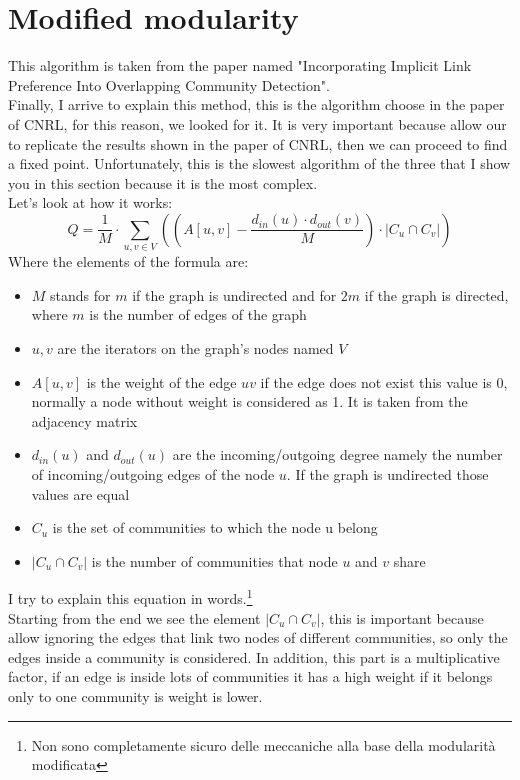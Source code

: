 \section{Modified modularity}
This algorithm is taken from the paper named "Incorporating Implicit Link Preference Into Overlapping Community Detection".\\
Finally, I arrive to explain this method, this is the algorithm choose in the paper of CNRL, for this reason, we looked for it. It is very important because allow our to replicate the results shown in the paper of CNRL, then we can proceed to find a fixed point. Unfortunately, this is the slowest algorithm of the three that I show you in this section because it is the most complex.\\
Let's look at how it works:
\begin{equation}
	Q = \frac{1}{M} \cdot \sum_{u,v \in V}
		\left(
			\left( A \left[ u,v \right] - \frac{ d_{in}\left(u\right) \cdot d_{out}\left(v\right) }{M} \right)
			\cdot
			|C_u \cap C_v| 
		\right)
	\label{eq:m_mod}
\end{equation}
Where the elements of the formula are:
\begin{itemize}
	\item $M$ stands for $m$ if the graph is undirected and for $2m$ if the graph is directed, where $m$ is the number of edges of the graph
	\item $u,v$ are the iterators on the graph's nodes named $V$
	\item $A \left[ u,v \right]$ is the weight of the edge $uv$ if the edge does not exist this value is 0, normally a node without weight is considered as 1. It is taken from the adjacency matrix
	\item $d_{in}\left(u\right)$ and $d_{out}\left(u\right)$ are the incoming/outgoing degree namely the number of incoming/outgoing edges of the node $u$. If the graph is undirected those values are equal
	\item $C_u$ is the set of communities to which the node u belong
	\item $|C_u \cap C_v|$ is the number of communities that node $u$ and $v$ share
\end{itemize}
I try to explain this equation in words.\footnote{Non sono completamente sicuro delle meccaniche alla base della modularità modificata}\\
Starting from the end we see the element $\displaystyle |C_u \cap C_v|$, this is important because allow ignoring the edges that link two nodes of different communities, so only the edges inside a community is considered. In addition, this part is a multiplicative factor, if an edge is inside lots of communities it has a high weight if it belongs only to one community is weight is lower.\\
